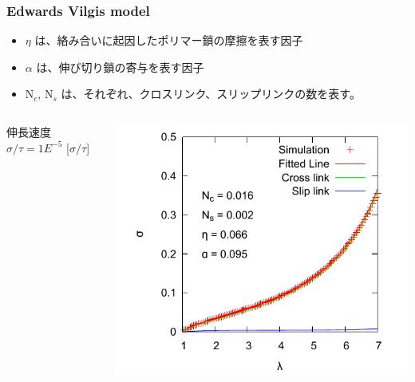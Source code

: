 \documentclass[11pt, dvipdfmx]{beamer}
\begin{document}
\begin{frame}
\frametitle{Edwards Vilgis model}

\footnotesize
\begin{itemize}
\item
$\eta$ は、絡み合いに起因したポリマー鎖の摩擦を表す因子
\item
$\alpha$ は、伸び切り鎖の寄与を表す因子
\item
N$_c$, N$_s$ は、それぞれ、クロスリンク、スリップリンクの数を表す。
\end{itemize}

\vspace{-3mm}


\begin{columns}[totalwidth=1\textwidth]
\begin{center}
伸長速度 $\sigma/\tau = 1E^{-5}$ [$\sigma/\tau$]
\end{center}
\vspace{-3mm}
\includegraphics[width=\columnwidth]{./fig/E_V.pdf}


\end{columns}
\end{frame}
\end{document}
